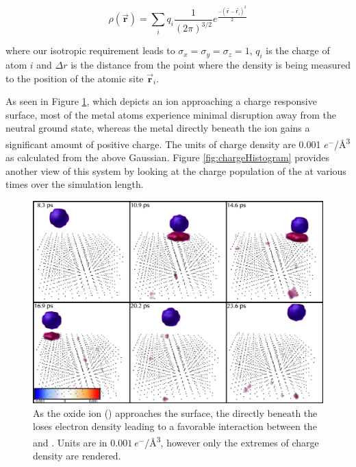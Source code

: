 \begin{equation*}
\rho(\vec{\mathbf{r}}) = \sum_i q_{i} \frac{1}{(2\pi)^{3/2}}e^{\frac{-(\vec{\mathbf{r}}-\vec{\mathbf{r}}_i)^2}{2}}
\end{equation*}

where our isotropic requirement leads to $\sigma_x = \sigma_y = \sigma_z = 1$,
$q_i$ is the charge of atom $i$ and $\Delta r$ is the distance from the point
where the density is being measured to the position of the atomic site
$\vec{\mathbf{r}}_i$. 

As seen in Figure \ref{fig:chargeVol}, which depicts an  ion approaching
a charge responsive  surface, most of the metal atoms experience minimal
disruption away from the neutral ground state, whereas the metal directly
beneath the  ion gains a significant amount of positive charge. The
units of charge density are 0.001 $e^-$/\AA\textsuperscript{3} as calculated from the
above Gaussian. Figure \ref{fig:chargeHistogram} provides another view of this
system by looking at the charge population of the  at various times over
the simulation length.

\begin{landscape}
\begin{figure}
  \centering
  \includegraphics[width=0.7\linewidth]{../figures/chap5/PtOChargeVolume.pdf}
  \caption{As the oxide ion () approaches the surface, the  directly beneath
the  loses electron density leading to a favorable interaction between
the  and . Units are in $0.001\ e^-$/\AA\textsuperscript{3},
however only the extremes of charge density are rendered.}
\label{fig:chargeVol}
\end{figure}
\end{landscape}

